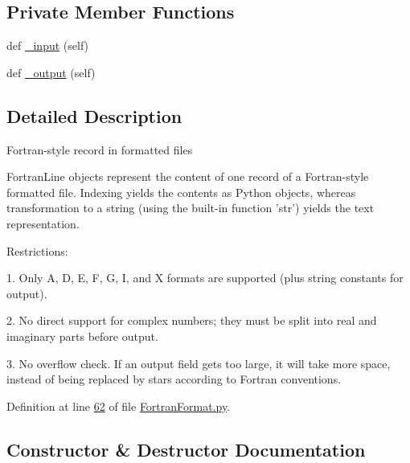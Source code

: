 \subsection*{Private Member Functions}
\begin{DoxyCompactItemize}
\item 
def \hyperlink{classpyneb_1_1utils_1_1_fortran_format_1_1_fortran_line_a578ada89c0a7d1e519ba15fca4888073}{\+\_\+input} (self)
\item 
def \hyperlink{classpyneb_1_1utils_1_1_fortran_format_1_1_fortran_line_ad05b9dd81ba899bde2235ae9409a6f38}{\+\_\+output} (self)
\end{DoxyCompactItemize}


\subsection{Detailed Description}
\begin{DoxyVerb}Fortran-style record in formatted files

FortranLine objects represent the content of one record of a
Fortran-style formatted file. Indexing yields the contents as
Python objects, whereas transformation to a string (using the
built-in function 'str') yields the text representation.

Restrictions:

  1. Only A, D, E, F, G, I, and X formats are supported (plus string
     constants for output).

  2. No direct support for complex numbers; they must be split into
     real and imaginary parts before output.

  3. No overflow check. If an output field gets too large, it will
     take more space, instead of being replaced by stars according
     to Fortran conventions.
\end{DoxyVerb}
 

Definition at line \hyperlink{_fortran_format_8py_source_l00062}{62} of file \hyperlink{_fortran_format_8py_source}{Fortran\+Format.\+py}.



\subsection{Constructor \& Destructor Documentation}
\hypertarget{classpyneb_1_1utils_1_1_fortran_format_1_1_fortran_line_a292ba8e3d93bd751d6d13fdc1671ccb2}{}

